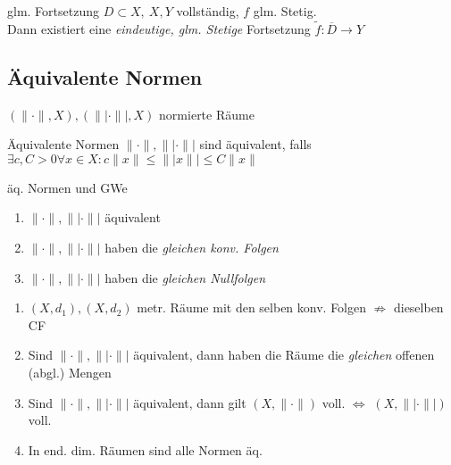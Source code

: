 \begin{satz}{glm. Fortsetzung}
  $D\subset X,\ X,Y$ vollständig, $f$ glm. Stetig.\\
  Dann existiert eine \textit{eindeutige, glm. Stetige} Fortsetzung
  $\tilde{f}: \overline{D} \to Y$
\end{satz}



\subsection{Äquivalente Normen}

$(\|\cdot\|, X), (\||\cdot\||, X)$ normierte Räume\\

\begin{definition}{Äquivalente Normen}
  $\|\cdot\|, \||\cdot\||$ sind äquivalent, falls
  $\exists c,C>0 \forall x\in X: c\|x\| \leq \||x\|| \leq C \|x\|$
\end{definition}

\begin{satz}{äq. Normen und GWe}
  \begin{enumerate}[label = $\Leftrightarrow$]
    \item $\|\cdot\|, \||\cdot\||$ äquivalent
    \item $\|\cdot\|, \||\cdot\||$ haben die \textit{gleichen konv. Folgen}
    \item $\|\cdot\|, \||\cdot\||$ haben die \textit{gleichen Nullfolgen}
  \end{enumerate}
\end{satz}

\begin{bemerkung}

  \begin{enumerate}[label = (\roman*)]
    \item $(X,d_1),(X,d_2)$ metr. Räume mit den selben konv. Folgen
      $\not\Rightarrow$ dieselben CF
    \item Sind $\|\cdot\|, \||\cdot\||$ äquivalent, dann haben die Räume die
      \textit{gleichen} offenen (abgl.) Mengen
    \item Sind $\|\cdot\|, \||\cdot\||$ äquivalent, dann gilt
      $(X,\|\cdot\|)$ voll. $\Leftrightarrow$ $(X,\||\cdot\||)$ voll.
    \item In end. dim. Räumen sind alle Normen äq.
  \end{enumerate}
\end{bemerkung}



